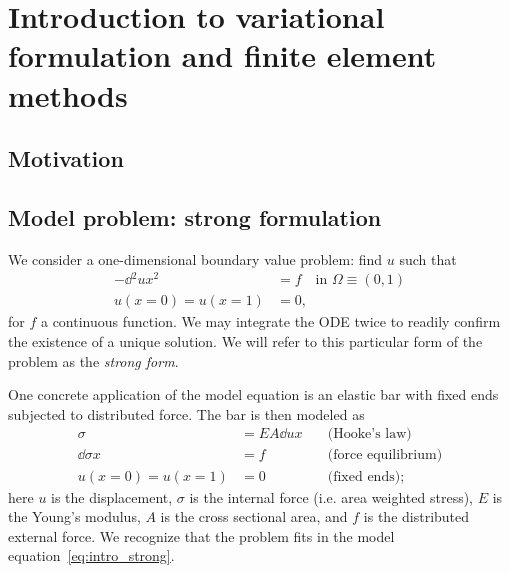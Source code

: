 \chapter{Introduction to variational formulation and finite element methods}

\disclaimer

\section{Motivation}

\section{Model problem: strong formulation}
We consider a one-dimensional boundary value problem: find $u$ such that
\begin{align}
  - \dd{^2u}{x^2} &= f \quad \text{in } \Omega \equiv (0,1) \label{eq:intro_strong} \\
  u(x=0) = u(x=1) &= 0 , 
\end{align}
for $f$ a continuous function.  We may integrate the ODE twice to readily confirm the existence of a unique solution.  We will refer to this particular form of the problem as the \emph{strong form}.

One concrete application of the model equation is an elastic bar with fixed ends subjected to distributed force.  The bar is then modeled as
\begin{align*}
  \sigma &= EA \dd{u}{x} \quad &\text{(Hooke's law)} \\
  \dd{\sigma}{x} &= f \quad &\text{(force equilibrium)} \\
  u(x=0) = u(x=1) &=0 \quad &\text{(fixed ends)};
\end{align*}
here $u$ is the displacement, $\sigma$ is the internal force (i.e. area weighted stress), $E$ is the Young's modulus, $A$ is the cross sectional area, and $f$ is the distributed external force. We recognize that the problem fits in the model equation~\eqref{eq:intro_strong}.


